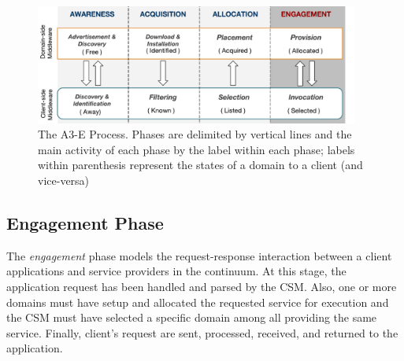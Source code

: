 
\begin{figure}[tbp]
	\includegraphics[width=0.95\textwidth]{figs/A3-E-process}
	\caption{The A3-E Process. Phases are delimited by vertical lines and the main activity of each phase by the label within each phase; labels within parenthesis represent the states of a domain to a client (and vice-versa)}
	\label{fig:A3-E-process}
\end{figure}



\subsection*{Engagement Phase}\label{sec:A3-E-engagement}

The \textit{engagement} phase models the request-response interaction between a client applications and service providers in the continuum. At this stage, the application request has been handled and parsed by the CSM. Also, one or more domains must have setup and allocated the requested service for execution and the CSM must have selected a specific domain among all providing the same service. Finally, client's request are sent, processed, received, and returned to the application.


